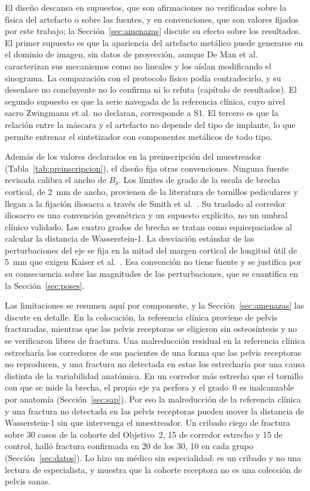 El diseño descansa en supuestos, que son afirmaciones no verificadas sobre la física del artefacto o sobre las fuentes, y en convenciones, que son valores fijados por este trabajo; la Sección~\ref{sec:amenazas} discute su efecto sobre los resultados. El primer supuesto es que la apariencia del artefacto metálico puede generarse en el dominio de imagen, sin datos de proyección, aunque De Man et al.~\cite{deman1999} caracterizan sus mecanismos como no lineales y los aíslan modificando el sinograma. La comparación con el protocolo físico podía contradecirlo, y su desenlace no concluyente no lo confirma ni lo refuta (capítulo de resultados). El segundo supuesto es que la serie navegada de la referencia clínica, cuyo nivel sacro Zwingmann et al. no declaran, corresponde a S1. El tercero es que la relación entre la máscara y el artefacto no depende del tipo de implante, lo que permite entrenar el sintetizador con componentes metálicos de todo tipo.

Además de los valores declarados en la preinscripción del muestreador (Tabla~\ref{tab:preinscripcion}), el diseño fija otras convenciones. Ninguna fuente revisada calibra el ancho de $B_{\delta}$. Los límites de grado de la escala de brecha cortical, de 2~mm de ancho, provienen de la literatura de tornillos pediculares \cite{gertzbein1990,mirza2003} y llegan a la fijación iliosacra a través de Smith et al.~\cite{smith2006iliosacral}. Su traslado al corredor iliosacro es una convención geométrica y un supuesto explícito, no un umbral clínico validado. Los cuatro grados de brecha se tratan como equiespaciados al calcular la distancia de Wasserstein-1. La desviación estándar de las perturbaciones del eje se fija en la mitad del margen cortical de longitud útil de 5~mm que exigen Kaiser et al.~\cite{kaiser2014dysmorphism}. Esa convención no tiene fuente y se justifica por su consecuencia sobre las magnitudes de las perturbaciones, que se cuantifica en la Sección~\ref{sec:poses}.

Las limitaciones se resumen aquí por componente, y la Sección~\ref{sec:amenazas} las discute en detalle. En la colocación, la referencia clínica proviene de pelvis fracturadas, mientras que las pelvis receptoras se eligieron sin osteosíntesis y no se verificaron libres de fractura. Una malreducción residual en la referencia clínica estrecharía los corredores de sus pacientes de una forma que las pelvis receptoras no reproducen, y una fractura no detectada en estas los estrecharía por una causa distinta de la variabilidad anatómica. En un corredor más estrecho que el tornillo con que se mide la brecha, el propio eje ya perfora y el grado~0 es inalcanzable por anatomía (Sección~\ref{sec:sap}). Por eso la malreducción de la referencia clínica y una fractura no detectada en las pelvis receptoras pueden mover la distancia de Wasserstein-1 sin que intervenga el muestreador. Un cribado ciego de fractura sobre 30 casos de la cohorte del Objetivo~2, 15 de corredor estrecho y 15 de control, halló fractura confirmada en 20 de los 30, 10 en cada grupo (Sección~\ref{sec:datos}). Lo hizo un médico sin especialidad: es un cribado y no una lectura de especialista, y muestra que la cohorte receptora no es una colección de pelvis sanas.

